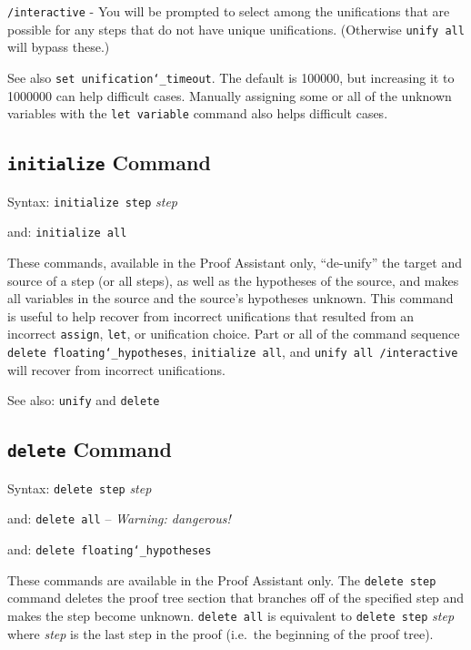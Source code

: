     \texttt{/interactive} - You will be prompted to select among the
        unifications
        that are possible for any steps that do not have unique
        unifications.  (Otherwise \texttt{unify all} will bypass these.)

See also \texttt{set unification{\char`\_}timeout}.  The default is
100000, but increasing it to 1000000 can help difficult cases.  Manually
assigning some or all of the unknown variables with the \texttt{let
variable} command also helps difficult cases.



\subsection{\texttt{initialize} Command}
Syntax:  \texttt{initialize step} {\em step}

    and: \texttt{initialize all}

These commands, available in the Proof Assistant
only, ``de-unify'' the target and source of a step (or all steps), as
well as the hypotheses of the source, and makes all variables in the
source and the source's hypotheses unknown.  This command is useful to
help recover from incorrect unifications that resulted from an incorrect
\texttt{assign}, \texttt{let}, or unification choice.  Part or all of
the command sequence \texttt{delete floating{\char`\_}hypotheses},
\texttt{initialize all}, and \texttt{unify all /interactive} will recover
from incorrect unifications.

See also:  \texttt{unify} and \texttt{delete}



\subsection{\texttt{delete} Command}
Syntax:  \texttt{delete step} {\em step}

   and:      \texttt{delete all} -- {\em Warning: dangerous!}

   and:      \texttt{delete floating{\char`\_}hypotheses}

These commands are available in the Proof Assistant only.  The
\texttt{delete step} command deletes the proof tree section that
branches off of the specified step and makes the step become unknown.
\texttt{delete all} is equivalent to \texttt{delete step} {\em step}
where {\em step} is the last step in the proof (i.e.\ the beginning of
the proof tree).

